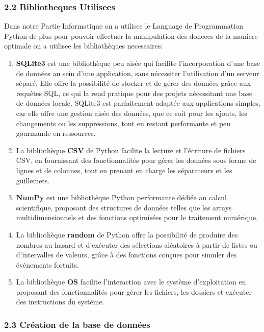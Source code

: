 \documentclass[
]{article}
\begin{document}
\subsubsection{2.2 Bibliotheques
Utilisees}\label{bibliotheques-utilisees}

Dans notre Partie Informatique on a utilisee le Language de
Programmation Python de plus pour pouvoir effectuer la manipulation des
doneees de la maniere optimale on a utilisee les bibliothèques
necessaires:

\begin{enumerate}
\def\labelenumi{\arabic{enumi}.}
\item
  \textbf{SQLite3} est une bibliothèque peu aisée qui facilite
  l'incorporation d'une base de données au sein d'une application, sans
  nécessiter l'utilisation d'un serveur séparé. Elle offre la
  possibilité de stocker et de gérer des données grâce aux requêtes SQL,
  ce qui la rend pratique pour des projets nécessitant une base de
  données locale. SQLite3 est parfaitement adaptée aux applications
  simples, car elle offre une gestion aisée des données, que ce soit
  pour les ajouts, les changements ou les suppressions, tout en restant
  performante et peu gourmande en ressources.
\item
  La bibliothèque \textbf{CSV} de Python facilite la lecture et
  l'écriture de fichiers CSV, en fournissant des fonctionnalités pour
  gérer les données sous forme de lignes et de colonnes, tout en prenant
  en charge les séparateurs et les guillemets.
\item
  \textbf{NumPy} est une bibliothèque Python performante dédiée au
  calcul scientifique, proposant des structures de données telles que
  les arrays multidimensionnels et des fonctions optimisées pour le
  traitement numérique.
\item
  La bibliothèque \textbf{random} de Python offre la possibilité de
  produire des nombres au hasard et d'exécuter des sélections aléatoires
  à partir de listes ou d'intervalles de valeurs, grâce à des fonctions
  conçues pour simuler des événements fortuits.
\item
  La bibliothèque \textbf{OS} facilite l'interaction avec le système
  d'exploitation en proposant des fonctionnalités pour gérer les
  fichiers, les dossiers et exécuter des instructions du système.
\end{enumerate}

\subsubsection{2.3 Création de la base de
données}\label{cruxe9ation-de-la-base-de-donnuxe9es}
\end{document}
